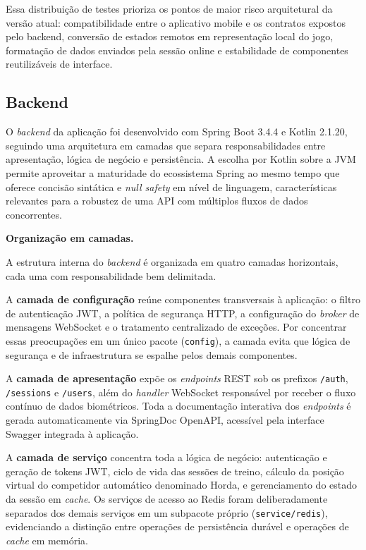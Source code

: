 Essa distribuição de testes prioriza os pontos de maior risco arquitetural da versão atual: compatibilidade entre o aplicativo mobile e os contratos expostos pelo backend, conversão de estados remotos em representação local do jogo, formatação de dados enviados pela sessão online e estabilidade de componentes reutilizáveis de interface.

\subsection{Backend}

O \textit{backend} da aplicação foi desenvolvido com Spring Boot 3.4.4 e Kotlin 2.1.20, seguindo uma arquitetura em camadas que separa responsabilidades entre apresentação, lógica de negócio e persistência. A escolha por Kotlin sobre a JVM permite aproveitar a maturidade do ecossistema Spring ao mesmo tempo que oferece concisão sintática e \textit{null safety} em nível de linguagem, características relevantes para a robustez de uma API com múltiplos fluxos de dados concorrentes.

\vspace{0.2cm}
\noindent\textbf{Organização em camadas.}
\vspace{0.2cm}

A estrutura interna do \textit{backend} é organizada em quatro camadas horizontais, cada uma com responsabilidade bem delimitada.

A \textbf{camada de configuração} reúne componentes transversais à aplicação: o filtro de autenticação JWT, a política de segurança HTTP, a configuração do \textit{broker} de mensagens WebSocket e o tratamento centralizado de exceções. Por concentrar essas preocupações em um único pacote (\texttt{config}), a camada evita que lógica de segurança e de infraestrutura se espalhe pelos demais componentes.

A \textbf{camada de apresentação} expõe os \textit{endpoints} REST sob os prefixos \texttt{/auth}, \texttt{/sessions} e \texttt{/users}, além do \textit{handler} WebSocket responsável por receber o fluxo contínuo de dados biométricos. Toda a documentação interativa dos \textit{endpoints} é gerada automaticamente via SpringDoc OpenAPI, acessível pela interface Swagger integrada à aplicação.

A \textbf{camada de serviço} concentra toda a lógica de negócio: autenticação e geração de tokens JWT, ciclo de vida das sessões de treino, cálculo da posição virtual do competidor automático denominado Horda, e gerenciamento do estado da sessão em \textit{cache}. Os serviços de acesso ao Redis foram deliberadamente separados dos demais serviços em um subpacote próprio (\texttt{service/redis}), evidenciando a distinção entre operações de persistência durável e operações de \textit{cache} em memória.

